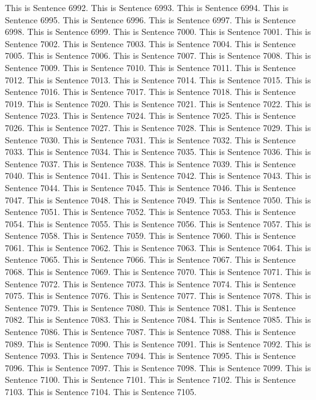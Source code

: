 \documentclass{article}
\begin{document}
This is Sentence 6992.
This is Sentence 6993.
This is Sentence 6994.
This is Sentence 6995.
This is Sentence 6996.
This is Sentence 6997.
This is Sentence 6998.
This is Sentence 6999.
This is Sentence 7000.
This is Sentence 7001.
This is Sentence 7002.
This is Sentence 7003.
This is Sentence 7004.
This is Sentence 7005.
This is Sentence 7006.
This is Sentence 7007.
This is Sentence 7008.
This is Sentence 7009.
This is Sentence 7010.
This is Sentence 7011.
This is Sentence 7012.
This is Sentence 7013.
This is Sentence 7014.
This is Sentence 7015.
This is Sentence 7016.
This is Sentence 7017.
This is Sentence 7018.
This is Sentence 7019.
This is Sentence 7020.
This is Sentence 7021.
This is Sentence 7022.
This is Sentence 7023.
This is Sentence 7024.
This is Sentence 7025.
This is Sentence 7026.
This is Sentence 7027.
This is Sentence 7028.
This is Sentence 7029.
This is Sentence 7030.
This is Sentence 7031.
This is Sentence 7032.
This is Sentence 7033.
This is Sentence 7034.
This is Sentence 7035.
This is Sentence 7036.
This is Sentence 7037.
This is Sentence 7038.
This is Sentence 7039.
This is Sentence 7040.
This is Sentence 7041.
This is Sentence 7042.
This is Sentence 7043.
This is Sentence 7044.
This is Sentence 7045.
This is Sentence 7046.
This is Sentence 7047.
This is Sentence 7048.
This is Sentence 7049.
This is Sentence 7050.
This is Sentence 7051.
This is Sentence 7052.
This is Sentence 7053.
This is Sentence 7054.
This is Sentence 7055.
This is Sentence 7056.
This is Sentence 7057.
This is Sentence 7058.
This is Sentence 7059.
This is Sentence 7060.
This is Sentence 7061.
This is Sentence 7062.
This is Sentence 7063.
This is Sentence 7064.
This is Sentence 7065.
This is Sentence 7066.
This is Sentence 7067.
This is Sentence 7068.
This is Sentence 7069.
This is Sentence 7070.
This is Sentence 7071.
This is Sentence 7072.
This is Sentence 7073.
This is Sentence 7074.
This is Sentence 7075.
This is Sentence 7076.
This is Sentence 7077.
This is Sentence 7078.
This is Sentence 7079.
This is Sentence 7080.
This is Sentence 7081.
This is Sentence 7082.
This is Sentence 7083.
This is Sentence 7084.
This is Sentence 7085.
This is Sentence 7086.
This is Sentence 7087.
This is Sentence 7088.
This is Sentence 7089.
This is Sentence 7090.
This is Sentence 7091.
This is Sentence 7092.
This is Sentence 7093.
This is Sentence 7094.
This is Sentence 7095.
This is Sentence 7096.
This is Sentence 7097.
This is Sentence 7098.
This is Sentence 7099.
This is Sentence 7100.
This is Sentence 7101.
This is Sentence 7102.
This is Sentence 7103.
This is Sentence 7104.
This is Sentence 7105.
\end{document}
